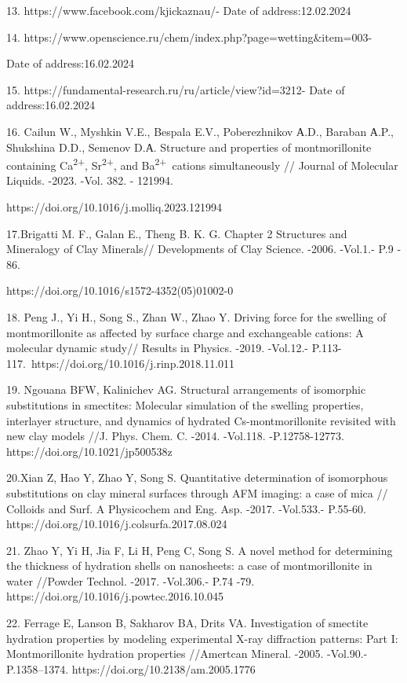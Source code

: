 13. https://www.facebook.com/kjickaznau/- Date of address:12.02.2024

14. https://www.openscience.ru/chem/index.php?page=wetting\&item=003-

Date of address:16.02.2024

15. https://fundamental-research.ru/ru/article/view?id=3212- Date of
address:16.02.2024

16. Cailun W., Myshkin V.E., Bespala E.V., Poberezhnikov А.D., Baraban
А.P., Shukshina D.D., Semenov D.А. Structure and properties of
montmorillonite containing Ca\textsuperscript{2+},
Sr\textsuperscript{2+}, and Ba\textsuperscript{2+}~cations
simultaneously // Journal of Molecular Liquids. -2023. -Vol. 382. -
121994.

https://doi.org/10.1016/j.molliq.2023.121994

17.Brigatti M. F., Galan E., Theng B. K. G. Chapter 2 Structures and
Mineralogy of Clay Minerals// Developments of Clay Science. -2006.
-Vol.1.- P.9 - 86.~

https://doi.org/10.1016/s1572-4352(05)01002-0

18. Peng J., Yi H., Song S., Zhan W., Zhao Y. Driving force for the
swelling of montmorillonite as affected by surface charge and
exchangeable cations: A molecular dynamic study// Results in Physics.
-2019. -Vol.12.- P.113-117.~https://doi.org/10.1016/j.rinp.2018.11.011

19. Ngouana BFW, Kalinichev AG. Structural arrangements of isomorphic
substitutions in smectites: Molecular simulation of the swelling
properties, interlayer structure, and dynamics of hydrated
Cs-montmorillonite revisited with new clay models //J. Phys. Chem. C.
-2014. -Vol.118. -P.12758-12773. https://doi.org/10.1021/jp500538z

20.Xian Z, Hao Y, Zhao Y, Song S. Quantitative determination of
isomorphous substitutions on clay mineral surfaces through AFM imaging:
a case of mica // Colloids and Surf. A Physicochem and Eng. Asp. -2017.
-Vol.533.- P.55-60. https://doi.org/10.1016/j.colsurfa.2017.08.024

21. Zhao Y, Yi H, Jia F, Li H, Peng C, Song S. A novel method for
determining the thickness of hydration shells on nanosheets: a case of
montmorillonite in water //Powder Technol. -2017. -Vol.306.- P.74 -79.
https://doi.org/10.1016/j.powtec.2016.10.045

22. Ferrage E, Lanson B, Sakharov BA, Drits VA. Investigation of
smectite hydration properties by modeling experimental X-ray diffraction
patterns: Part I: Montmorillonite hydration properties //Amertcan
Mineral. -2005. -Vol.90.- P.1358--1374.
https://doi.org/10.2138/am.2005.1776

